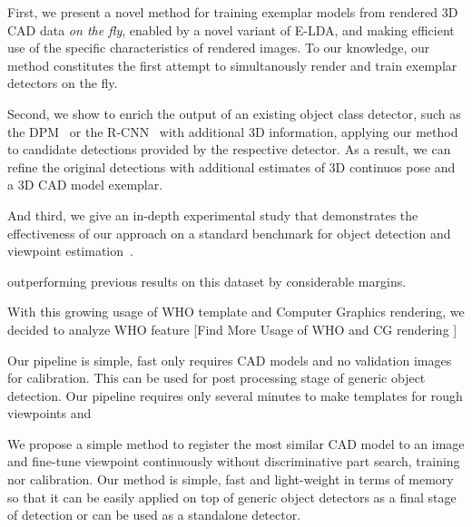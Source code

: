 First, we present a novel method for training exemplar models from
rendered 3D CAD data {\em on the fly}, enabled by a novel variant of
E-LDA, and making efficient use of the specific characteristics of
rendered images. To our knowledge, our method constitutes the first
attempt to simultanously render and train exemplar detectors on the
fly.

Second, we show to enrich the output of an existing object class
detector, such as the DPM~\cite{Felzenszwalb10} or the
R-CNN~\cite{Girshick14} with additional 3D information, applying our
method to candidate detections provided by the respective detector. As
a result, we can refine the original detections with additional
estimates of 3D continuos pose and a 3D CAD model exemplar.

And third, we give an in-depth experimental study that demonstrates
the effectiveness of our approach on a standard benchmark for
object detection and viewpoint estimation~\cite{Xiang14}. 


outperforming previous results on this dataset by considerable
margins.



With this growing usage of WHO template and Computer Graphics
rendering, we decided to analyze WHO feature
[Find More Usage of WHO and CG rendering \cite{Pepik12}]




Our pipeline is simple, fast only requires CAD models and no
validation images for calibration. This can be used for post
processing stage of generic object detection. Our pipeline requires
only several minutes to make templates for rough viewpoints and 


We propose a simple method to register the most similar CAD model to
an image and fine-tune viewpoint continuously without discriminative
part search, training nor calibration. Our method is simple, fast and
light-weight in terms of memory so that it can be easily applied on
top of generic object detectors as a final stage of detection or can
be used as a standalone detector. 



